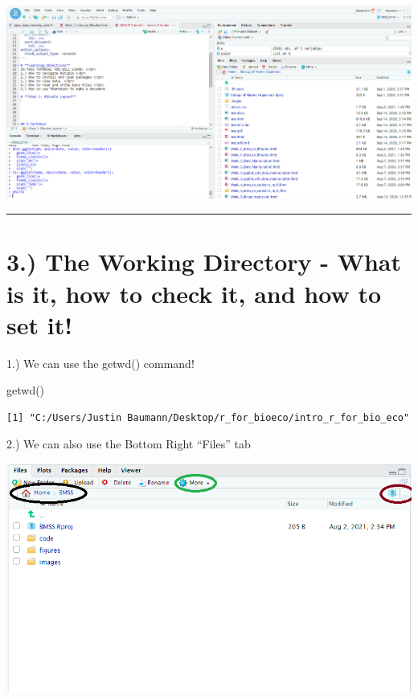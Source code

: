 \documentclass[
  letterpaper,
  DIV=11,
  numbers=noendperiod]{scrartcl}
\newenvironment{Shaded}{\begin{snugshade}}{\end{snugshade}}
\newcommand{\FunctionTok}[1]{\textcolor[rgb]{0.28,0.35,0.67}{#1}}
\newcommand{\NormalTok}[1]{\textcolor[rgb]{0.00,0.23,0.31}{#1}}
\begin{document}
\hypertarget{section}{%
\section*{}\label{section}}

\includegraphics{images/RStudio_layout.png}

\begin{center}\rule{0.5\linewidth}{0.5pt}\end{center}

\hypertarget{the-working-directory---what-is-it-how-to-check-it-and-how-to-set-it}{%
\section{\texorpdfstring{\textbf{3.) The Working Directory} - What is
it, how to check it, and how to set
it!}{3.) The Working Directory - What is it, how to check it, and how to set it!}}\label{the-working-directory---what-is-it-how-to-check-it-and-how-to-set-it}}

1.) We can use the getwd() command!

\begin{Shaded}
\begin{Highlighting}[]
\FunctionTok{getwd}\NormalTok{()}
\end{Highlighting}
\end{Shaded}

\begin{verbatim}
[1] "C:/Users/Justin Baumann/Desktop/r_for_bioeco/intro_r_for_bio_eco"
\end{verbatim}

2.) We can also use the Bottom Right ``Files'' tab

\includegraphics{images/files.png}
\end{document}
